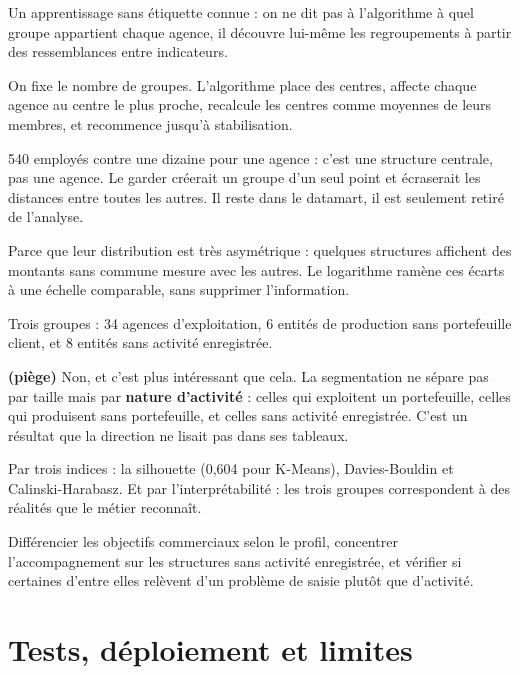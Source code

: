 \documentclass[a4paper,11pt]{article}
\begin{document}
Un apprentissage sans étiquette connue : on ne dit pas à l'algorithme à quel
groupe appartient chaque agence, il découvre lui-même les regroupements à partir
des ressemblances entre indicateurs.

On fixe le nombre de groupes. L'algorithme place des centres, affecte chaque
agence au centre le plus proche, recalcule les centres comme moyennes de leurs
membres, et recommence jusqu'à stabilisation.

540 employés contre une dizaine pour une agence : c'est une structure centrale,
pas une agence. Le garder créerait un groupe d'un seul point et écraserait les
distances entre toutes les autres. Il reste dans le datamart, il est seulement
retiré de l'analyse.

Parce que leur distribution est très asymétrique : quelques structures affichent
des montants sans commune mesure avec les autres. Le logarithme ramène ces
écarts à une échelle comparable, sans supprimer l'information.

Trois groupes : 34 agences d'exploitation, 6 entités de production sans
portefeuille client, et 8 entités sans activité enregistrée.

 \textbf{(piège)}
Non, et c'est plus intéressant que cela. La segmentation ne sépare pas par
taille mais par \textbf{nature d'activité} : celles qui exploitent un
portefeuille, celles qui produisent sans portefeuille, et celles sans activité
enregistrée. C'est un résultat que la direction ne lisait pas dans ses tableaux.

Par trois indices : la silhouette (0,604 pour K-Means), Davies-Bouldin et
Calinski-Harabasz. Et par l'interprétabilité : les trois groupes correspondent à
des réalités que le métier reconnaît.

Différencier les objectifs commerciaux selon le profil, concentrer
l'accompagnement sur les structures sans activité enregistrée, et vérifier si
certaines d'entre elles relèvent d'un problème de saisie plutôt que d'activité.

\section{Tests, déploiement et limites}
\end{document}
